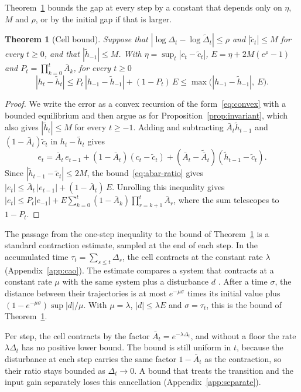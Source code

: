 \documentclass[11pt, a4paper]{article}
\newtheorem{theorem}[proposition]{Theorem}
\theoremstyle{remark}
\theoremstyle{plain}
\newcommand{\Abar}{\bar{A}}
\begin{document}
Theorem~\ref{thm:cell} bounds the gap at every step by a constant that depends only on $\eta$, $M$
and $\rho$, or by the initial gap if that is larger.

\begin{theorem}[Cell bound]
\label{thm:cell}
Suppose that $|\log\Delta_t - \log\tilde\Delta_t| \le \rho$ and $|\tilde c_t| \le M$ for every
$t \ge 0$, and that $|\tilde h_{-1}| \le M$. With $\eta = \sup_t |c_t - \tilde c_t|$,
$E = \eta + 2M(e^{\rho} - 1)$ and $P_t = \prod_{k=0}^{t} \Abar_k$, for every $t \ge 0$
\[
  |h_t - \tilde h_t| \le P_t\, |h_{-1} - \tilde h_{-1}| + (1 - P_t)\, E
    \le \max\bigl( |h_{-1} - \tilde h_{-1}|,\ E \bigr).
\]
\end{theorem}

\begin{proof}
We write the error as a convex recursion of the form~\eqref{eq:convex} with a bounded
equilibrium and then argue as for Proposition~\ref{prop:invariant}, which also gives
$|\tilde h_t| \le M$ for every $t \ge -1$. Adding and subtracting $\Abar_t\tilde h_{t-1}$ and
$(1 - \Abar_t)\tilde c_t$ in $h_t - \tilde h_t$ gives
\begin{equation}
\label{eq:error}
  e_t = \Abar_t\, e_{t-1} + (1 - \Abar_t)(c_t - \tilde c_t)
        + (\Abar_t - \tilde{\Abar}_t)(\tilde h_{t-1} - \tilde c_t).
\end{equation}
Since $|\tilde h_{t-1} - \tilde c_t| \le 2M$, the bound~\eqref{eq:abar-ratio} gives
$|e_t| \le \Abar_t\, |e_{t-1}| + (1 - \Abar_t)\, E$. Unrolling this inequality gives
$|e_t| \le P_t |e_{-1}| + E \sum_{k=0}^{t} (1 - \Abar_k) \prod_{r=k+1}^{t} \Abar_r$, where the
sum telescopes to $1 - P_t$.
\end{proof}

The passage from the one-step inequality to the bound of Theorem~\ref{thm:cell} is a standard
contraction estimate, sampled at the end of each step. In the accumulated time
$\tau_t = \sum_{s \le t}\Delta_s$, the cell contracts at the constant rate $\lambda$
(Appendix~\ref{app:cao})\@. The estimate compares a system that contracts at a constant rate $\mu$
with the same system plus a disturbance $d$ \citep{lohmiller1998contraction,bullo2026contraction}.
After a time $\sigma$, the distance between their trajectories is at most $e^{-\mu\sigma}$ times
its initial value plus $(1 - e^{-\mu\sigma})\sup|d|/\mu$. With $\mu = \lambda$,
$|d| \le \lambda E$ and $\sigma = \tau_t$, this is the bound of Theorem~\ref{thm:cell}.

Per step, the cell contracts by the factor $\Abar_t = e^{-\lambda\Delta_t}$, and without a floor
the rate $\lambda\Delta_t$ has no positive lower bound. The bound is still uniform in $t$, because
the disturbance at each step carries the same factor $1 - \Abar_t$ as the contraction, so their
ratio stays bounded as $\Delta_t \to 0$. A bound that treats the transition and the input gain
separately loses this cancellation (Appendix~\ref{app:separate})\@.
\end{document}
